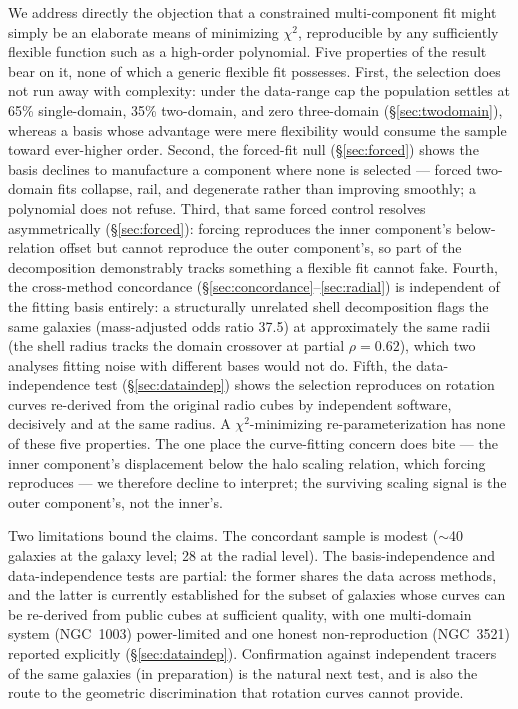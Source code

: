 \documentclass[twocolumn]{aastex701}
\begin{document}
We address directly the objection that a constrained multi-component fit might
simply be an elaborate means of minimizing $\chi^2$, reproducible by any
sufficiently flexible function such as a high-order polynomial. Five properties of
the result bear on it, none of which a generic flexible fit possesses. First, the
selection does not run away with complexity: under the data-range cap the
population settles at 65\% single-domain, 35\% two-domain, and zero three-domain
(\S\ref{sec:twodomain}), whereas a basis whose advantage were mere flexibility
would consume the sample toward ever-higher order. Second, the forced-fit null
(\S\ref{sec:forced}) shows the basis declines to manufacture a component where
none is selected --- forced two-domain fits collapse, rail, and degenerate rather
than improving smoothly; a polynomial does not refuse. Third, that same forced
control resolves asymmetrically (\S\ref{sec:forced}): forcing reproduces the
inner component's below-relation offset but cannot reproduce the outer
component's, so part of the decomposition demonstrably tracks something a flexible
fit cannot fake. Fourth, the cross-method concordance
(\S\ref{sec:concordance}--\ref{sec:radial}) is independent of the fitting
basis entirely: a structurally unrelated shell decomposition flags the same
galaxies (mass-adjusted odds ratio 37.5) at approximately the same radii (the
shell radius tracks the domain crossover at partial $\rho = 0.62$), which two
analyses fitting noise with different bases would not do. Fifth, the
data-independence test (\S\ref{sec:dataindep}) shows the selection reproduces on
rotation curves re-derived from the original radio cubes by independent software,
decisively and at the same radius. A $\chi^2$-minimizing re-parameterization has
none of these five properties. The one place the curve-fitting concern does bite
--- the inner component's displacement below the halo scaling relation, which
forcing reproduces --- we therefore decline to interpret; the surviving scaling
signal is the outer component's, not the inner's.

Two limitations bound the claims. The concordant sample is modest
($\sim$40 galaxies at the galaxy level; 28 at the radial level). The
basis-independence and data-independence tests are partial: the former shares the
data across methods, and the latter is currently established for the subset of
galaxies whose curves can be re-derived from public cubes at sufficient quality,
with one multi-domain system (NGC~1003) power-limited and one honest
non-reproduction (NGC~3521) reported explicitly (\S\ref{sec:dataindep}).
Confirmation against independent tracers of the same galaxies (in preparation)
is the natural next test, and is also the route to the geometric discrimination
that rotation curves cannot provide.
\end{document}
